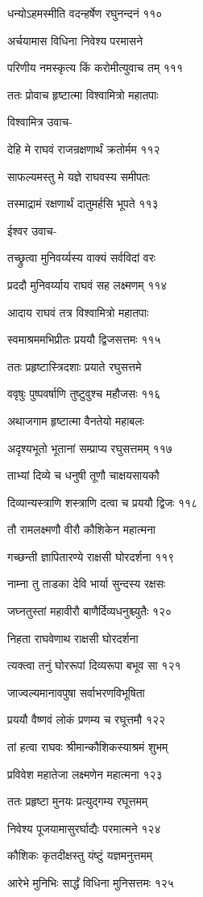 धन्योऽहमस्मीति वदन्हर्षेण रघुनन्दनं ११०

अर्चयामास विधिना निवेश्य परमासने

परिणीय नमस्कृत्य किं करोमीत्युवाच तम् १११

ततः प्रोवाच हृष्टात्मा विश्वामित्रो महातपाः

विश्वामित्र उवाच-

देहि मे राघवं राजन्रक्षणार्थं क्रतोर्मम ११२

साफल्यमस्तु मे यज्ञे राघवस्य समीपतः

तस्माद्रामं रक्षणार्थं दातुमर्हसि भूपते ११३

ईश्वर उवाच-

तच्छ्रुत्वा मुनिवर्य्यस्य वाक्यं सर्वविदां वरः

प्रददौ मुनिवर्य्याय राघवं सह लक्ष्मणम् ११४

आदाय राघवं तत्र विश्वामित्रो महातपाः

स्वमाश्रममभिप्रीतः प्रययौ द्विजसत्तमः ११५

ततः प्रहृष्टास्त्रिदशाः प्रयाते रघुसत्तमे

ववृषुः पुष्पवर्षाणि तुष्टुवुश्च महौजसः ११६

अथाजगाम हृष्टात्मा वैनतेयो महाबलः

अदृश्यभूतो भूतानां सम्प्राप्य रघुसत्तमम् ११७

ताभ्यां दिव्ये च धनुषी तूणौ चाक्षयसायकौ

दिव्यान्यस्त्राणि शस्त्राणि दत्वा च प्रययौ द्विजः ११८

तौ रामलक्ष्मणौ वीरौ कौशिकेन महात्मना

गच्छन्ती ज्ञापितारण्ये राक्षसी घोरदर्शना ११९

नाम्ना तु ताडका देवि भार्या सुन्दस्य रक्षसः

जघ्नतुस्तां महावीरौ बाणैर्दिव्यधनुश्च्युतैः १२०

निहता राघवेणाथ राक्षसी घोरदर्शना

त्यक्त्वा तनुं घोररूपां दिव्यरूपा बभूव सा १२१

जाज्वल्यमानावपुषा सर्वाभरणविभूषिता

प्रययौ वैष्णवं लोकं प्रणम्य च रघूत्तमौ १२२

तां हत्वा राघवः श्रीमान्कौशिकस्याश्रमं शुभम्

प्रविवेश महातेजा लक्ष्मणेन महात्मना १२३

ततः प्रहृष्टा मुनयः प्रत्युद्गम्य रघूत्तमम्

निवेश्य पूजयामासुरर्घाद्यैः परमात्मने १२४

कौशिकः कृतदीक्षस्तु यंष्टुं यज्ञमनुत्तमम्

आरेभे मुनिभिः सार्द्धं विधिना मुनिसत्तमः १२५

